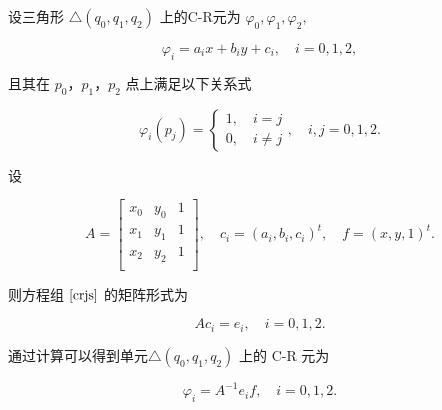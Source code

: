 \documentclass[a4paper,UTF8,titlepage,10pt]{ctexart}
\numberwithin{equation}{subsection}
\begin{document}
设三角形 $\bigtriangleup(q_0,q_1,q_2)$ 上的C-R元为 $\varphi_0, \varphi_1,\varphi_2,$

\begin{equation}
\varphi_i = a_i x + b_i y + c_i, \quad i = 0,1,2 ,
\end{equation}

且其在 $p_0$，$p_1$，$p_2$ 点上满足以下关系式

\begin{equation}
\varphi_i(p_j) = \begin{cases}
	1, \quad i = j \\
	0, \quad i \ne j	
\end{cases}, \quad i, j = 0,1,2 .
\label{crjs}
\end{equation}

设

$$
A = \begin{bmatrix}
	x_0 & y_0 &1 \\
	x_1 & y_1 &1 \\
	x_2 & y_2 &1 \\
\end{bmatrix}, \quad 
c_i = (a_i,b_i,c_i)^t , \quad
f = (x,y,1)^t .
$$

则方程组 $\eqref{crjs}$ 的矩阵形式为

\begin{equation}
A c_i = e_i, \quad i = 0,1,2 .
\end{equation}

通过计算可以得到单元$\bigtriangleup(q_0, q_1, q_2)$ 上的 C-R 元为

\begin{equation}
\varphi_i = A^{-1} e_i f, \quad i = 0,1,2 .
\end{equation} 

\end{document}
